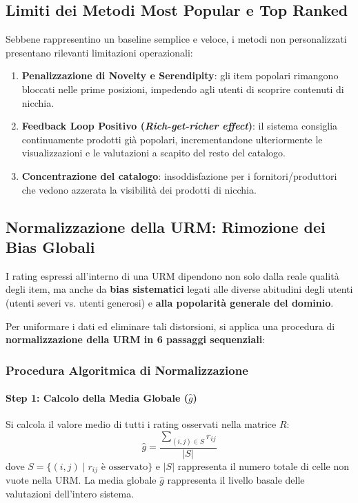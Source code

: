 \subsection{Limiti dei Metodi Most Popular e Top Ranked}
Sebbene rappresentino un baseline semplice e veloce, i metodi non personalizzati presentano rilevanti limitazioni operazionali:
\begin{enumerate}
    \item \textbf{Penalizzazione di Novelty e Serendipity}: gli item popolari rimangono bloccati nelle prime posizioni, impedendo agli utenti di scoprire contenuti di nicchia.
    \item \textbf{Feedback Loop Positivo (\textit{Rich-get-richer effect})}: il sistema consiglia continuamente prodotti già popolari, incrementandone ulteriormente le visualizzazioni e le valutazioni a scapito del resto del catalogo.
    \item \textbf{Concentrazione del catalogo}: insoddisfazione per i fornitori/produttori che vedono azzerata la visibilità dei prodotti di nicchia.
\end{enumerate}

\subsection{Normalizzazione della URM: Rimozione dei Bias Globali}
I rating espressi all'interno di una URM dipendono non solo dalla reale qualità degli item, ma anche da \textbf{bias sistematici} legati alle diverse abitudini degli utenti (utenti severi vs. utenti generosi) e \textbf{alla popolarità generale del dominio}.

Per uniformare i dati ed eliminare tali distorsioni, si applica una procedura di \textbf{normalizzazione della URM in 6 passaggi sequenziali}:

\subsubsection{Procedura Algoritmica di Normalizzazione}

\paragraph{Step 1: Calcolo della Media Globale ($\hat{g}$)}
Si calcola il valore medio di tutti i rating osservati nella matrice $R$:
\[
\hat{g} = \frac{\sum_{(i,j) \in S} r_{ij}}{|S|}
\]
dove $S = \{(i,j) \mid r_{ij} \text{ è osservato}\}$ e $|S|$ rappresenta il numero totale di celle non vuote nella URM. La media globale $\hat{g}$ rappresenta il livello basale delle valutazioni dell'intero sistema.

